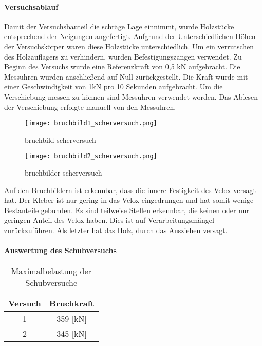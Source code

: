 \documentclass[12 pt,a4 paper ]{scrreprt}
\begin{document}
\paragraph{Versuchsablauf}
 
Damit der Versuchsbauteil die schräge Lage einnimmt, wurde Holzstücke entsprechend der Neigungen angefertigt. Aufgrund der Unterschiedlichen Höhen der Versuchskörper waren diese Holzstücke unterschiedlich. Um ein verrutschen des Holzauflagers zu verhindern, wurden Befestigungszangen verwendet.
Zu Beginn des Versuchs wurde eine Referenzkraft von 0,5 kN aufgebracht. Die Messuhren wurden anschließend auf Null zurückgestellt.
Die Kraft wurde mit einer Geschwindigkeit von 1kN pro 10 Sekunden aufgebracht. Um die Verschiebung messen zu können sind Messuhren verwendet worden. Das Ablesen der Verschiebung erfolgte manuell von den Messuhren.

\begin{figure}
\begin{minipage}[hbt]{7cm}	
	\texttt{[image: bruchbild1\_scherversuch.png]}
	\caption{bruchbild scherversuch}
	\label{bruchbild scherversuch}
\end{minipage}
\hfill
\begin{minipage}[hbt]{7cm}
	\texttt{[image: bruchbild2\_scherversuch.png]}
	\caption{bruchbilder scherversuch}
	\label{bruchbilder scherversuch}
\end{minipage}
\end{figure}

Auf den Bruchbildern ist erkennbar, dass die innere Festigkeit des Velox versagt hat. Der Kleber ist nur gering in das Velox eingedrungen und hat somit  wenige Bestanteile gebunden. Es sind teilweise Stellen erkennbar, die keinen oder nur geringen Anteil des Velox haben. Dies ist auf Verarbeitungsmängel zurückzuführen.
Als letzter hat das Holz, durch das Ausziehen versagt. 


\paragraph{Auswertung des Schubversuchs}

\clearpage{}


\begin{table}
\caption{Maximalbelastung der Schubversuche}
\begin{center}

\begin{tabular}{|c|c|}
\hline 
Versuch & Bruchkraft  \\ 
\hline 
1 & 359 [kN] \\ 
\hline 
2 & 345 [kN] \\ 
\hline 
\end{tabular} 


\end{center}
\end{table}
\end{document}
